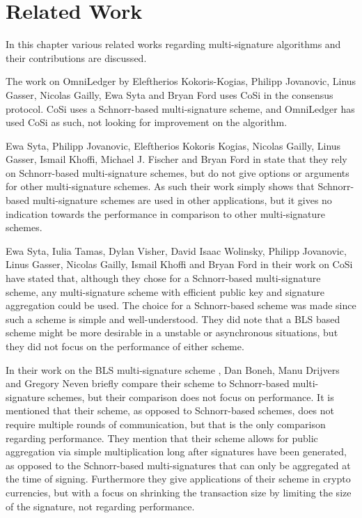 \chapter{Related Work}
In this chapter various related works regarding multi-signature algorithms and their contributions are discussed.

The work on OmniLedger \cite{OmniLedger} by Eleftherios Kokoris-Kogias, Philipp Jovanovic, Linus Gasser, Nicolas Gailly, Ewa Syta and Bryan Ford uses CoSi \cite{CoSi} in the consensus protocol. CoSi uses a Schnorr-based multi-signature scheme, and OmniLedger has used CoSi as such, not looking for improvement on the algorithm.

Ewa Syta, Philipp Jovanovic, Eleftherios Kokoris Kogias, Nicolas Gailly, Linus Gasser, Ismail Khoffi, Michael J. Fischer and Bryan Ford in \cite{RandHound} state that they rely on Schnorr-based multi-signature schemes, but do not give options or arguments for other multi-signature schemes. As such their work simply shows that Schnorr-based multi-signature schemes are used in other applications, but it gives no indication towards the performance in comparison to other multi-signature schemes.

Ewa Syta, Iulia Tamas, Dylan Visher, David Isaac Wolinsky, Philipp Jovanovic, Linus Gasser, Nicolas Gailly, Ismail Khoffi and Bryan Ford \cite{CoSi} in their work on CoSi have stated that, although they chose for a Schnorr-based multi-signature scheme, any multi-signature scheme with efficient public key and signature aggregation could be used. The choice for a Schnorr-based scheme was made since such a scheme is simple and well-understood. They did note that a BLS \cite{BLS} based scheme might be more desirable in a unstable or asynchronous situations, but they did not focus on the performance of either scheme.

In their work on the BLS multi-signature scheme \cite{BLSMulti}, Dan Boneh, Manu Drijvers and Gregory Neven briefly compare their scheme to Schnorr-based multi-signature schemes, but their comparison does not focus on performance. It is mentioned that their scheme, as opposed to Schnorr-based schemes, does not require multiple rounds of communication, but that is the only comparison regarding performance. They mention that their scheme allows for public aggregation via simple multiplication long after signatures have been generated,  as opposed to the Schnorr-based multi-signatures that can only be aggregated at the time of signing. Furthermore they give applications of their scheme in crypto currencies, but with a focus on shrinking the transaction size by limiting the size of the signature, not regarding performance.

